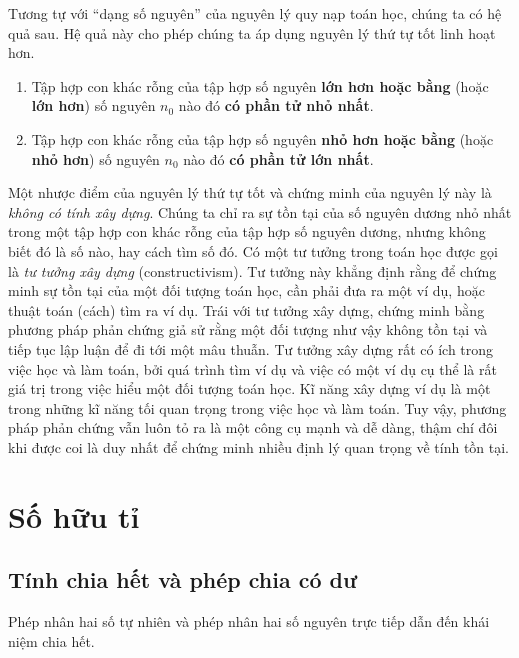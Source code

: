 Tương tự với ``dạng số nguyên'' của nguyên lý quy nạp toán học, chúng ta có hệ quả sau. Hệ quả này cho phép chúng ta áp dụng nguyên lý thứ tự tốt linh hoạt hơn.

\begin{corollary}
	\begin{enumerate}[label={(\roman*)}]
		\item Tập hợp con khác rỗng của tập hợp số nguyên \textbf{lớn hơn hoặc bằng} (hoặc \textbf{lớn hơn}) số nguyên $n_{0}$ nào đó \textbf{có phần tử nhỏ nhất}.
		\item Tập hợp con khác rỗng của tập hợp số nguyên \textbf{nhỏ hơn hoặc bằng} (hoặc \textbf{nhỏ hơn}) số nguyên $n_{0}$ nào đó \textbf{có phần tử lớn nhất}.
	\end{enumerate}
\end{corollary}

Một nhược điểm của nguyên lý thứ tự tốt và chứng minh của nguyên lý này là \textit{không có tính xây dựng}. Chúng ta chỉ ra sự tồn tại của số nguyên dương nhỏ nhất trong một tập hợp con khác rỗng của tập hợp số nguyên dương, nhưng không biết đó là số nào, hay cách tìm số đó. Có một tư tưởng trong toán học được gọi là \textit{tư tưởng xây dựng} (constructivism). Tư tưởng này khẳng định rằng để chứng minh sự tồn tại của một đối tượng toán học, cần phải đưa ra một ví dụ, hoặc thuật toán (cách) tìm ra ví dụ. Trái với tư tưởng xây dựng, chứng minh bằng phương pháp phản chứng giả sử rằng một đối tượng như vậy không tồn tại và tiếp tục lập luận để đi tới một mâu thuẫn. Tư tưởng xây dựng rất có ích trong việc học và làm toán, bởi quá trình tìm ví dụ và việc có một ví dụ cụ thể là rất giá trị trong việc hiểu một đối tượng toán học. Kĩ năng xây dựng ví dụ là một trong những kĩ năng tối quan trọng trong việc học và làm toán. Tuy vậy, phương pháp phản chứng vẫn luôn tỏ ra là một công cụ mạnh và dễ dàng, thậm chí đôi khi được coi là duy nhất để chứng minh nhiều định lý quan trọng về tính tồn tại.

\section{Số hữu tỉ}\label{section:rationals}

\subsection*{Tính chia hết và phép chia có dư}

Phép nhân hai số tự nhiên và phép nhân hai số nguyên trực tiếp dẫn đến khái niệm chia hết.

